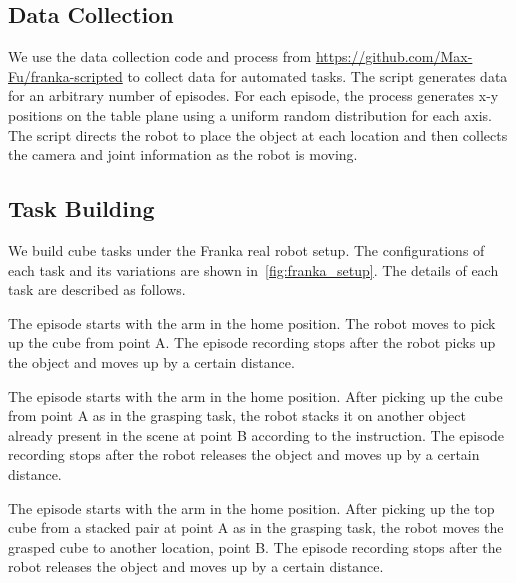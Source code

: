 \subsection{Data Collection}
We use the data collection code and process from \href{https://github.com/Max-Fu/franka-scripted}{https://github.com/Max-Fu/franka-scripted} to collect data for automated tasks. The script generates data for an arbitrary number of episodes. For each episode, the process generates x-y positions on the table plane using a uniform random distribution for each axis. The script directs the robot to place the object at each location and then collects the camera and joint information as the robot is moving.


\subsection{Task Building}
We build cube tasks under the Franka real robot setup. The configurations of each task and its variations are shown in~\cref{fig:franka_setup}. The details of each task are described as follows.


 The episode starts with the arm in the home position. The robot moves to pick up the cube from point A. The episode recording stops after the robot picks up the object and moves up by a certain distance.

 The episode starts with the arm in the home position. After picking up the cube from point A as in the grasping task, the robot stacks it on another object already present in the scene at point B according to the instruction. The episode recording stops after the robot releases the object and moves up by a certain distance.

 The episode starts with the arm in the home position. After picking up the top cube from a stacked pair at point A as in the grasping task, the robot moves the grasped cube to another location, point B. The episode recording stops after the robot releases the object and moves up by a certain distance.